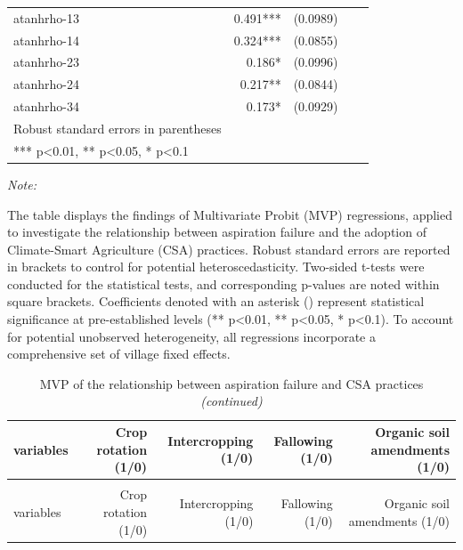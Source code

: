 \documentclass[
]{article}
\begin{document}
\begin{landscape}
\begin{ThreePartTable}
\begin{longtable}[t]{lrrrr}
atanhrho-13 & 0.491*** & (0.0989) &  & \\
atanhrho-14 & 0.324*** & (0.0855) &  & \\
atanhrho-23 & 0.186* & (0.0996) &  & \\
atanhrho-24 & 0.217** & (0.0844) &  & \\
atanhrho-34 & 0.173* & (0.0929) &  & \\
\midrule
Robust standard errors in parentheses &  &  &  & \\
*** p<0.01, ** p<0.05, * p<0.1 &  &  &  & \\*
\end{longtable}
\end{ThreePartTable}
\endgroup{}
\end{landscape}
\newpage

\begin{landscape}\begingroup\fontsize{7}{9}\selectfont

\begin{ThreePartTable}
\begin{TableNotes}[para]
\item \textit{Note: } 
\item The table displays the findings of Multivariate Probit (MVP) regressions, applied to investigate the relationship between aspiration failure and the adoption of Climate-Smart Agriculture (CSA) practices. Robust standard errors are reported in brackets to control for potential heteroscedasticity. Two-sided t-tests were conducted for the statistical tests, and corresponding p-values are noted within square brackets. Coefficients denoted with an asterisk () represent statistical significance at pre-established levels (** p<0.01, ** p<0.05, * p<0.1). To account for potential unobserved heterogeneity, all regressions incorporate a comprehensive set of village fixed effects.
\end{TableNotes}
\begin{longtable}[t]{lrrrr}
\caption{\label{tab:unnamed-chunk-14}MVP of the relationship between aspiration failure and CSA practices}\\
\toprule
variables & Crop rotation (1/0) & Intercropping (1/0) & Fallowing (1/0) & Organic soil amendments (1/0)\\
\midrule
\endfirsthead
\caption[]{\label{tab:unnamed-chunk-14}MVP of the relationship between aspiration failure and CSA practices \textit{(continued)}}\\
\toprule
variables & Crop rotation (1/0) & Intercropping (1/0) & Fallowing (1/0) & Organic soil amendments (1/0)\\
\midrule
\endhead


\end{longtable}
\end{ThreePartTable}
\end{landscape}
\end{document}
